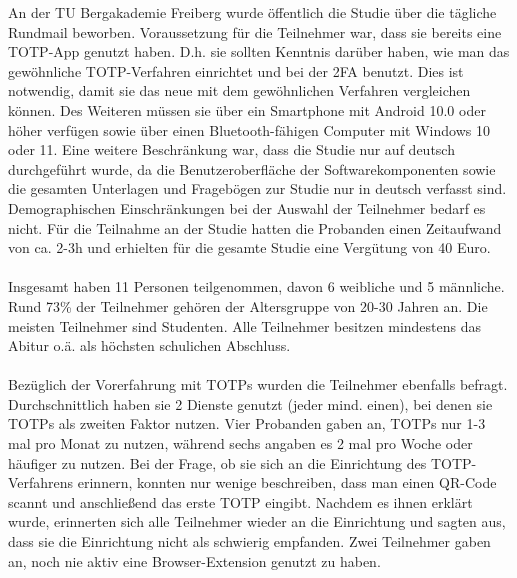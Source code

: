 An der TU Bergakademie Freiberg wurde öffentlich die Studie über die tägliche 
Rundmail beworben. Voraussetzung für die Teilnehmer war, dass sie bereits eine 
TOTP-App genutzt haben. D.h. sie sollten Kenntnis darüber haben, wie man das 
gewöhnliche TOTP-Verfahren einrichtet und bei der 2FA benutzt. Dies ist 
notwendig, damit sie das neue mit dem gewöhnlichen Verfahren vergleichen 
können. Des Weiteren müssen sie über ein Smartphone mit Android 10.0 oder höher 
verfügen sowie über einen Bluetooth-fähigen Computer mit Windows 10 oder 11. 
Eine weitere Beschränkung war, dass die Studie nur auf deutsch durchgeführt 
wurde, da die Benutzeroberfläche der Softwarekomponenten sowie die gesamten 
Unterlagen und Fragebögen zur Studie nur in deutsch verfasst sind.
Demographischen Einschränkungen bei der Auswahl der Teilnehmer bedarf es nicht.
Für die Teilnahme an der Studie hatten die Probanden einen Zeitaufwand von ca. 
2-3h und erhielten für die gesamte Studie eine Vergütung von 40 Euro.
\\\\
Insgesamt haben 11 Personen teilgenommen, davon 6 weibliche und 5 männliche. 
Rund 73\% der Teilnehmer gehören der Altersgruppe von 20-30 Jahren an. Die 
meisten Teilnehmer sind Studenten. Alle Teilnehmer besitzen mindestens das Abitur o.ä. als höchsten schulichen Abschluss.
\\\\
Bezüglich der Vorerfahrung mit TOTPs wurden die Teilnehmer ebenfalls befragt. 
Durchschnittlich haben sie 2 Dienste genutzt (jeder mind. einen), bei denen sie 
TOTPs als zweiten Faktor nutzen. Vier Probanden gaben an, TOTPs nur 1-3 mal pro Monat zu 
nutzen, während sechs angaben es 2 mal pro Woche oder häufiger zu nutzen. Bei der 
Frage, ob sie sich an die Einrichtung des TOTP-Verfahrens erinnern, konnten nur 
wenige beschreiben, dass man einen QR-Code scannt und anschließend das erste 
TOTP eingibt. Nachdem es ihnen erklärt wurde, erinnerten sich alle Teilnehmer wieder an 
die Einrichtung und sagten aus, dass sie die Einrichtung nicht 
als schwierig empfanden. Zwei Teilnehmer gaben an, noch nie aktiv eine Browser-Extension genutzt zu haben.